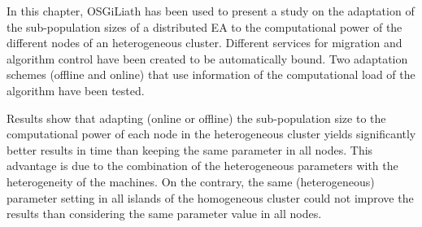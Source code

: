 

In this chapter, OSGiLiath has been used to present a study on the adaptation of the sub-population sizes of a distributed EA to the computational power of the different nodes of an heterogeneous cluster.  Different services for migration and algorithm control have been created to be automatically bound. Two adaptation schemes (offline and online) that use information of the computational load of the algorithm have been tested.

Results show that adapting (online or offline) the sub-po\-pu\-la\-tion size to the computational power of each node in the heterogeneous cluster yields significantly
better results in time than keeping the same parameter in all nodes. This advantage is due to the combination of the heterogeneous parameters with the heterogeneity of the machines. On the contrary, the same (heterogeneous) parameter setting in all islands of the homogeneous cluster could not improve the results than considering the same parameter value in all nodes.



